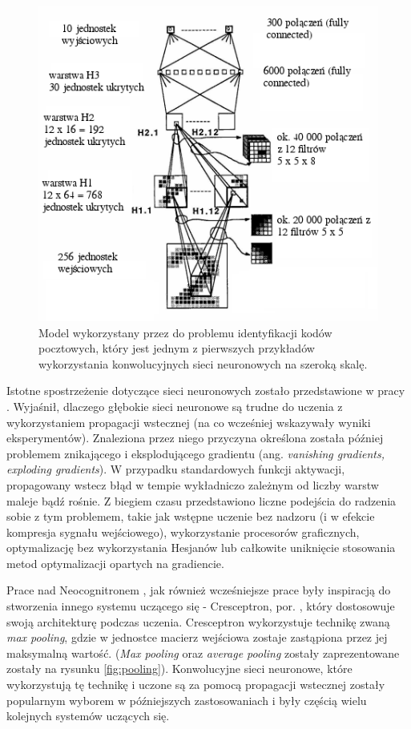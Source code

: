 \documentclass[12pt,a4paper,twoside]{article}
\begin{document}
\begin{figure}[h]
  \centering
\includegraphics[scale=0.6]{../obrazy/fig:lecunmnist.png}
\caption{Model wykorzystany przez \citet{lecun1989b} do problemu identyfikacji kodów pocztowych, który jest jednym z pierwszych przykładów wykorzystania konwolucyjnych sieci neuronowych na szeroką skalę. \label{fig:lecunmnist}}
\end{figure}

Istotne spostrzeżenie dotyczące sieci neuronowych zostało przedstawione w pracy \citet{hochreiter1991}. Wyjaśnił, dlaczego głębokie sieci neuronowe są trudne do uczenia z wykorzystaniem propagacji wstecznej (na co wcześniej wskazywały wyniki eksperymentów). Znaleziona przez niego przyczyna określona została później problemem znikającego i eksplodującego gradientu (ang. \textit{vanishing gradients, exploding gradients}). W przypadku standardowych funkcji aktywacji, propagowany wstecz błąd w tempie wykładniczo zależnym od liczby warstw maleje bądź rośnie. Z biegiem czasu przedstawiono liczne podejścia do radzenia sobie z tym problemem, takie jak wstępne uczenie bez nadzoru (i w efekcie kompresja sygnału wejściowego), wykorzystanie procesorów graficznych, optymalizację bez wykorzystania Hesjanów lub całkowite uniknięcie stosowania metod optymalizacji opartych na gradiencie.

Prace nad Neocognitronem \citep{fukushima1980}, jak również wcześniejsze prace \citep{ivakhnenko1968} były inspiracją do stworzenia innego systemu uczącego się - Cresceptron, por. \citet{weng1992}, który dostosowuje swoją architekturę podczas uczenia. Cresceptron wykorzystuje technikę zwaną \textit{max pooling}, gdzie w jednostce macierz wejściowa zostaje zastąpiona przez jej maksymalną wartość. (\textit{Max pooling} oraz \textit{average pooling} zostały zaprezentowane zostały na rysunku \ref{fig:pooling}). Konwolucyjne sieci neuronowe, które wykorzystują tę technikę i uczone są za pomocą propagacji wstecznej zostały popularnym wyborem w późniejszych zastosowaniach i były częścią wielu kolejnych systemów uczących się.
\end{document}
